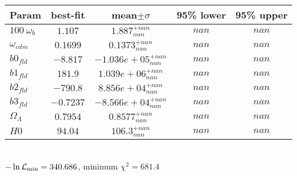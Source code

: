 \begin{tabular}{|l|c|c|c|c|} 
 \hline 
Param & best-fit & mean$\pm\sigma$ & 95\% lower & 95\% upper \\ \hline 
$100~\omega_{b }$ &$1.107$ & $1.887_{nan}^{+nan}$ & $nan$ & $nan$ \\ 
$\omega_{cdm }$ &$0.1699$ & $0.1373_{nan}^{+nan}$ & $nan$ & $nan$ \\ 
$b0_{fld }$ &$-8.817$ & $-1.036e+05_{nan}^{+nan}$ & $nan$ & $nan$ \\ 
$b1_{fld }$ &$181.9$ & $1.039e+06_{nan}^{+nan}$ & $nan$ & $nan$ \\ 
$b2_{fld }$ &$-790.8$ & $8.856e+04_{nan}^{+nan}$ & $nan$ & $nan$ \\ 
$b3_{fld }$ &$-0.7237$ & $-8.566e+04_{nan}^{+nan}$ & $nan$ & $nan$ \\ 
$\Omega_{\Lambda }$ &$0.7954$ & $0.8577_{nan}^{+nan}$ & $nan$ & $nan$ \\ 
$H0$ &$94.04$ & $106.3_{nan}^{+nan}$ & $nan$ & $nan$ \\ 
\hline 
 \end{tabular} \\ 
$-\ln{\cal L}_\mathrm{min} =340.686$, minimum $\chi^2=681.4$ \\ 
